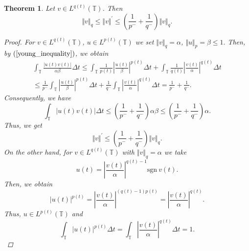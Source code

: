\documentclass[12pt,a4paper,oneside,titlepage]{article}
\newtheorem{Twierdzenie}{Theorem}
\begin{document}
\begin{Twierdzenie} Let $v \in L^{q(t)}(\mathbb{T})$. Then
\begin{equation}
\nonumber
\Vert v \Vert_{q} \leq \Vert v \Vert^{'} \leq \left( \frac{1}{p^-}+ \frac{1}{q^-} \right) \Vert v \Vert_{q}.
\end{equation}
\begin{proof}
For $v \in L^{q(t)}(\mathbb{T}) $, $u \in L^{p(t)}(\mathbb{T})$ we set $\Vert v \Vert_{q}= \alpha$, $\Vert u \Vert_{p}= \beta \leq 1.$ Then, by  $(\ref{young_inequality})$, we obtain
\begin{equation}
\nonumber
\begin{split}
\int_{\mathbb{T}} \frac{ \vert u(t) v(t) \vert}{\alpha \beta} \Delta t \leq \int_{\mathbb{T}} \frac{1}{p(t)} \left\vert \frac{u(t)}{\beta} \right\vert^{p(t)} \Delta t + \int_{\mathbb{T}} \frac{1}{q(t)} \left\vert \frac{v(t)}{\alpha} \right\vert^{q(t)} \Delta t \\
\leq \frac{1}{p^-} \int_{\mathbb{T}} \left\vert \frac{u(t)}{\beta} \right\vert^{p(t)} \Delta t + \frac{1}{q^-} \int_{\mathbb{T}} \left\vert \frac{v(t)}{\alpha} \right\vert^{q(t)} \Delta t 
= \frac{1}{p^-}+ \frac{1}{q^-}.
\end{split}
\end{equation}
Consequently, we have
\begin{equation}
\label{Holder}
\int_{\mathbb{T}} \vert u(t) v(t) \vert \Delta t \leq  \left(  \frac{1}{p^-} + \frac{1}{q^-}  \right) \alpha \beta \leq   \left( \frac{1}{p^-}+ \frac{1}{q^-} \right)  \alpha.
\end{equation}
Thus, we get
\begin{equation}
\nonumber
\Vert v \Vert^{'} \leq   \left(  \frac{1}{p^-}+ \frac{1}{q^-} \right) \Vert v \Vert_{q}.
\end{equation}
\indent
On the other hand, for $v \in L^{q(t)}(\mathbb{T})$ with $\Vert v \Vert_{q}=  \alpha$ we take
\begin{equation}
\nonumber
u(t) = \left\vert \frac{v(t)}{\alpha} \right\vert^{q(t)-1} \mathrm{sgn} \:v(t).
\end{equation}
Then, we obtain
\begin{equation}
\nonumber
\left\vert u(t) \right\vert^{p(t)} = \left\vert \frac{v(t)}{\alpha} \right\vert^{\left( q(t)-1 \right) p(t)} = \left\vert \frac{v(t)}{\alpha} \right\vert^{q(t)}.
\end{equation}
Thus, $u \in L^{p(t)}(\mathbb{T})$ and
\begin{equation}
\nonumber 
\int_{\mathbb{T}} \vert u(t) \vert^{p(t)} \Delta t = \int_{\mathbb{T}} \left\vert \frac{v(t)}{\alpha} \right\vert^{q(t)} \Delta t = 1.

\end{equation}
\end{proof}
\end{Twierdzenie}
\end{document}
